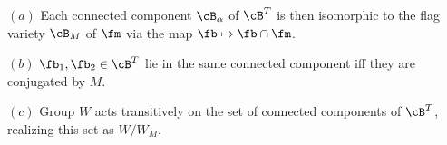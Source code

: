 \documentclass[12pt]{amsart}
\begin{document}
\begin{cor}\label{smL} \leavevmode

$(a)$  Each connected component $\cB_\alpha$ of $\cB^T$ is then isomorphic to the flag variety $\cB_M$ of $\fm$ via the map $\fb\mapsto \fb\cap \fm$.

$(b)$ $\fb_1, \fb_2 \in \cB^T$ lie in the same connected component iff they are conjugated by $M$. 

$(c)$ Group $W$ acts transitively on the set of connected components of $\cB^T$, realizing this set as $W/W_M$. 
\end{cor}

\end{document}
